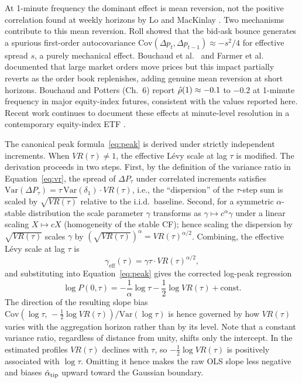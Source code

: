 \documentclass[conference]{IEEEtran}
\begin{document}
At 1-minute frequency the dominant effect is mean reversion, not the positive
correlation found at weekly horizons by Lo and MacKinlay \cite{LoMacKinlay1988}.
Two mechanisms contribute to this mean reversion. Roll \cite{Roll1984} showed that the bid-ask bounce
generates a spurious first-order autocovariance $\mathrm{Cov}(\Delta p_t,\Delta p_{t-1})\approx -s^2/4$ for effective spread $s$, a purely mechanical effect. Bouchaud et al.\ \cite{Bouchaud2004} and
Farmer et al.\ \cite{Farmer2006} documented that large market orders move prices but
this impact partially reverts as the order book replenishes, adding genuine
mean reversion at short horizons. Bouchaud and Potters \cite{BouchaudPotters2003} (Ch.~6)
report $\hat{\rho}(1)\approx -0.1$ to $-0.2$ at 1-minute frequency in major
equity-index futures, consistent with the values reported here.
Recent work continues to document these effects at minute-level resolution
in a contemporary equity-index ETF \cite{Deep2025}.

The canonical peak formula~\eqref{eq:peak} is derived under strictly
independent increments. When $VR(\tau)\neq 1$, the effective Lévy scale at
lag $\tau$ is modified. The derivation proceeds in two steps.
First, by the definition of the variance ratio in Equation~\eqref{eq:vr},
the spread of $\Delta P_\tau$ under correlated increments satisfies
$\mathrm{Var}(\Delta P_\tau)=\tau\,\mathrm{Var}(\delta_1)\cdot VR(\tau)$,
i.e., the ``dispersion'' of the $\tau$-step sum is scaled by $\sqrt{VR(\tau)}$
relative to the i.i.d.\ baseline.
Second, for a symmetric $\alpha$-stable distribution the scale parameter
$\gamma$ transforms as $\gamma\mapsto c^\alpha\gamma$ under a linear scaling
$X\mapsto cX$ (homogeneity of the stable CF); hence scaling the dispersion
by $\sqrt{VR(\tau)}$ scales $\gamma$ by $(\sqrt{VR(\tau)})^\alpha
= VR(\tau)^{\alpha/2}$.
Combining, the effective Lévy scale at lag $\tau$ is
\begin{equation}
  \gamma_{\mathrm{eff}}(\tau) = \gamma\tau\cdot VR(\tau)^{\alpha/2},
  \label{eq:gamma_eff}
\end{equation}
and substituting into Equation~\eqref{eq:peak} gives the corrected
log-peak regression
\begin{equation}
  \log P(0,\tau)
  = -\frac{1}{\alpha}\log\tau
    - \frac{1}{2}\log VR(\tau)
    + \mathrm{const}.
  \label{eq:corrected_peak}
\end{equation}
The direction of the resulting slope bias
$\mathrm{Cov}(\log\tau,\,-\tfrac12\log VR(\tau))/\mathrm{Var}(\log\tau)$ is hence governed by how $VR(\tau)$ varies with the aggregation
horizon rather than by its level. Note that a constant variance ratio, regardless of distance from unity, shifts only the intercept. In the estimated profiles $VR(\tau)$
declines with $\tau$, so $-\tfrac12\log VR(\tau)$ is positively associated
with $\log\tau$. Omitting it hence makes the raw OLS slope less negative and biases
$\hat{\alpha}_{\mathrm{tip}}$ upward toward the Gaussian boundary.
\end{document}
